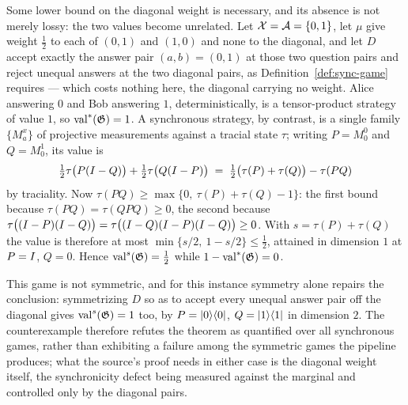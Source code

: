 \begin{remark}
\label{rem:almost-sync-hypothesis}
Some lower bound on the diagonal weight is necessary, and its absence is not merely
lossy: the two values become unrelated. Let $\mathcal{X} = \mathcal{A} = \{0,1\}$, let $\mu$ give weight
$\frac12$ to each of $(0,1)$ and $(1,0)$ and none to the diagonal, and let $D$ accept
exactly the answer pair $(a,b) = (0,1)$ at those two question pairs and reject unequal
answers at the two diagonal pairs, as Definition~\ref{def:sync-game} requires --- which
costs nothing here, the diagonal carrying no weight. Alice answering $0$ and Bob answering
$1$, deterministically, is a tensor-product strategy of value $1$, so
$\mathrm{val}^*(\mathfrak{G}) = 1$. A synchronous strategy, by contrast, is a single family
$\{M^x_a\}$ of projective measurements against a tracial state $\tau$; writing
$P = M^0_0$ and $Q = M^1_0$, its value is
\begin{equation*}
  \tfrac12 \tau\bigl( P (I - Q) \bigr) + \tfrac12 \tau\bigl( Q (I - P) \bigr)
  \;=\; \tfrac12 \bigl( \tau(P) + \tau(Q) \bigr) - \tau(PQ)
\end{equation*}
by traciality. Now $\tau(PQ) \geq \max\{0,\ \tau(P) + \tau(Q) - 1\}$: the first bound
because $\tau(PQ) = \tau(QPQ) \geq 0$, the second because
$\tau\bigl( (I - P)(I - Q) \bigr) = \tau\bigl( (I - Q)(I - P)(I - Q) \bigr)
\geq 0$. With $s = \tau(P) + \tau(Q)$ the value is therefore at most
$\min\{ s/2,\ 1 - s/2 \} \leq \frac12$, attained in dimension $1$ at $P = I$, $Q = 0$.
Hence $\mathrm{val}^{s}(\mathfrak{G}) = \frac12$ while $1 - \mathrm{val}^*(\mathfrak{G}) = 0$.

This game is not symmetric, and for this instance symmetry alone repairs the conclusion:
symmetrizing $D$ so as to accept every unequal answer pair off the diagonal gives
$\mathrm{val}^{s}(\mathfrak{G}) = 1$ too, by $P = |0\rangle\langle0|$, $Q = |1\rangle\langle1|$ in dimension $2$.
The counterexample therefore refutes the theorem as quantified over all synchronous games,
rather than exhibiting a failure among the symmetric games the pipeline produces; what the
source's proof needs in either case is the diagonal weight itself, the synchronicity
defect being measured against the marginal and controlled only by the diagonal pairs.


\end{remark}
